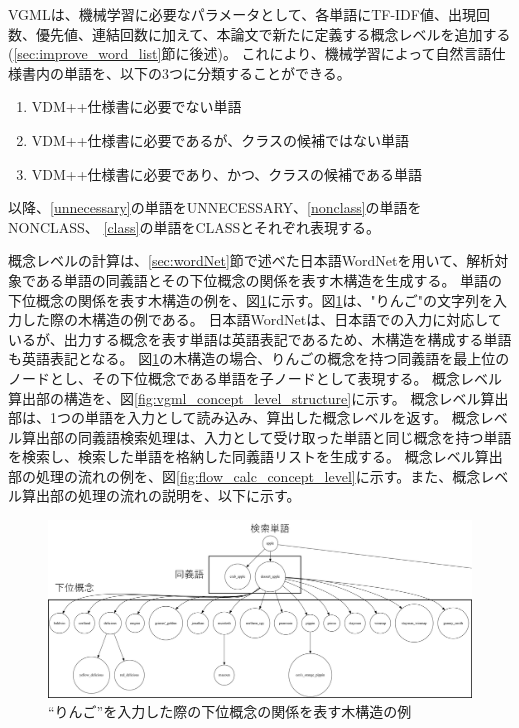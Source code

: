 VGMLは、機械学習に必要なパラメータとして、各単語にTF-IDF値、出現回数、優先値、連結回数に加えて、本論文で新たに定義する概念レベルを追加する(\ref{sec:improve_word_list}節に後述)。
これにより、機械学習によって自然言語仕様書内の単語を、以下の3つに分類することができる。

\begin{enumerate}[label=\textbf{\Alph*}.]
    \item VDM++仕様書に必要でない単語
    \label{unnecessary}
    \item VDM++仕様書に必要であるが、クラスの候補ではない単語
    \label{nonclass}
    \item VDM++仕様書に必要であり、かつ、クラスの候補である単語
    \label{class}
\end{enumerate}

以降、\ref{unnecessary}の単語をUNNECESSARY、\ref{nonclass}の単語をNONCLASS、
\ref{class}の単語をCLASSとそれぞれ表現する。

概念レベルの計算は、\ref{sec:wordNet}節で述べた日本語WordNetを用いて、解析対象である単語の同義語とその下位概念の関係を表す木構造を生成する。
単語の下位概念の関係を表す木構造の例を、図\ref{fig:tree_structure}に示す。図\ref{fig:tree_structure}は、"りんご"の文字列を入力した際の木構造の例である。
日本語WordNetは、日本語での入力に対応しているが、出力する概念を表す単語は英語表記であるため、木構造を構成する単語も英語表記となる。
図\ref{fig:tree_structure}の木構造の場合、りんごの概念を持つ同義語を最上位のノードとし、その下位概念である単語を子ノードとして表現する。
概念レベル算出部の構造を、図\ref{fig:vgml_concept_level_structure}に示す。
概念レベル算出部は、1つの単語を入力として読み込み、算出した概念レベルを返す。
概念レベル算出部の同義語検索処理は、入力として受け取った単語と同じ概念を持つ単語を検索し、検索した単語を格納した同義語リストを生成する。
概念レベル算出部の処理の流れの例を、図\ref{fig:flow_calc_concept_level}に示す。また、概念レベル算出部の処理の流れの説明を、以下に示す。

\begin{figure}[t]
    \begin{center}
        \includegraphics[width=1.0\columnwidth]{image/tree_structure.png}
        \caption{``りんご''を入力した際の下位概念の関係を表す木構造の例}
        \label{fig:tree_structure}
    \end{center}
\end{figure}

